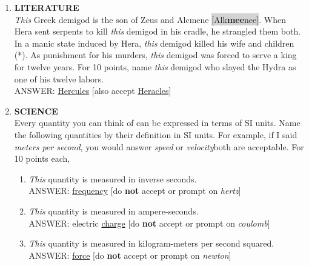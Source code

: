 \documentclass{report}
\newcommand*{\backtrack}{\setcounter{enumi}{\numexpr\theenumi-1\relax}}
\begin{document}
\begin{enumerate}
    \item \textbf{LITERATURE} \\ \textit{This} Greek demigod is the son of Zeus and Alcmene \colorbox{lightGray}{[Alk\textperiodcentered \textbf{mee}\textperiodcentered nee]}. When Hera sent serpents to kill \textit{this} demigod in his cradle, he strangled them both. In a manic state induced by Hera, \textit{this} demigod killed his wife and children (*). As punishment for his murders, \textit{this} demigod was forced to serve a king for twelve years. For 10 points, name \textit{this} demigod who slayed the Hydra as one of his twelve labors. \\ ANSWER: \underline{Hercules} [also accept \underline{Heracles}] \backtrack \newpage
    \item \textbf{SCIENCE} \\ Every quantity you can think of can be expressed in terms of SI units. Name the following quantities by their definition in SI units. For example, if I said \textit{meters per second}, you would answer \textit{speed} or \textit{velocity}\textemdash both are acceptable. For 10 points each,
    \begin{enumerate}[label=\Alph*]
        \item \textit{This} quantity is measured in inverse seconds. \\ ANSWER: \underline{frequency} [do \textbf{not} accept or prompt on \textit{hertz}]
        \item \textit{This} quantity is measured in ampere-seconds. \\ ANSWER: electric \underline{charge} [do \textbf{not} accept or prompt on \textit{coulomb}]
        \item \textit{This} quantity is measured in kilogram-meters per second squared. \\ ANSWER: \underline{force} [do \textbf{not} accept or prompt on \textit{newton}]
    \end{enumerate}


\end{enumerate}
\end{document}
